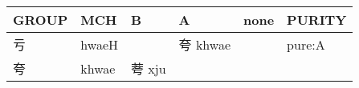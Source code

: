 \documentclass[14pt,a4paper]{scrartcl}
\begin{document}
\begin{longtable}[c]{@{}llllll@{}}
\toprule
\begin{minipage}[b]{0.14\columnwidth}\raggedright\strut
GROUP
\strut\end{minipage} &
\begin{minipage}[b]{0.14\columnwidth}\raggedright\strut
MCH
\strut\end{minipage} &
\begin{minipage}[b]{0.14\columnwidth}\raggedright\strut
B
\strut\end{minipage} &
\begin{minipage}[b]{0.14\columnwidth}\raggedright\strut
A
\strut\end{minipage} &
\begin{minipage}[b]{0.14\columnwidth}\raggedright\strut
none
\strut\end{minipage} &
\begin{minipage}[b]{0.14\columnwidth}\raggedright\strut
PURITY
\strut\end{minipage}\tabularnewline
\midrule
\endhead
\begin{minipage}[t]{0.14\columnwidth}\raggedright\strut
亏
\strut\end{minipage} &
\begin{minipage}[t]{0.14\columnwidth}\raggedright\strut
hwaeH
\strut\end{minipage} &
\begin{minipage}[t]{0.14\columnwidth}\raggedright\strut
\strut\end{minipage} &
\begin{minipage}[t]{0.14\columnwidth}\raggedright\strut
夸 khwae
\strut\end{minipage} &
\begin{minipage}[t]{0.14\columnwidth}\raggedright\strut
\strut\end{minipage} &
\begin{minipage}[t]{0.14\columnwidth}\raggedright\strut
pure:A
\strut\end{minipage}\tabularnewline
\begin{minipage}[t]{0.14\columnwidth}\raggedright\strut
夸
\strut\end{minipage} &
\begin{minipage}[t]{0.14\columnwidth}\raggedright\strut
khwae
\strut\end{minipage} &
\begin{minipage}[t]{0.14\columnwidth}\raggedright\strut
荂 xju
\strut\end{minipage} &
\begin{minipage}[t]{0.14\columnwidth}\raggedright\strut

\end{minipage}
\end{longtable}
\end{document}
